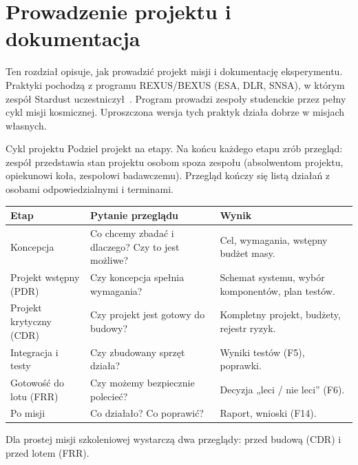 \chapter{Prowadzenie projektu i dokumentacja}\label{ch:projekt}

Ten rozdział opisuje, jak prowadzić projekt misji i dokumentację eksperymentu. Praktyki pochodzą z programu REXUS/BEXUS (ESA, DLR, SNSA), w którym zespół Stardust uczestniczył~\cite{praca2022,sed}. Program prowadzi zespoły studenckie przez pełny cykl misji kosmicznej. Uproszczona wersja tych praktyk działa dobrze w misjach własnych.

\begin{sekcja}{Cykl projektu}
Podziel projekt na etapy. Na końcu każdego etapu zrób przegląd: zespół przedstawia stan projektu osobom spoza zespołu (absolwentom projektu, opiekunowi koła, zespołowi badawczemu). Przegląd kończy się listą działań z osobami odpowiedzialnymi i terminami.

\renewcommand{\arraystretch}{1.3}
\small
\begin{tabularx}{\linewidth}{@{}P{30mm}LL@{}}
\toprule
\textbf{Etap} & \textbf{Pytanie przeglądu} & \textbf{Wynik}\\\midrule
Koncepcja & Co chcemy zbadać i dlaczego? Czy to jest możliwe? & Cel, wymagania, wstępny budżet masy.\\
Projekt wstępny (PDR) & Czy koncepcja spełnia wymagania? & Schemat systemu, wybór komponentów, plan testów.\\
Projekt krytyczny (CDR) & Czy projekt jest gotowy do budowy? & Kompletny projekt, budżety, rejestr ryzyk.\\
Integracja i testy & Czy zbudowany sprzęt działa? & Wyniki testów (F5), poprawki.\\
Gotowość do lotu (FRR) & Czy możemy bezpiecznie polecieć? & Decyzja „leci / nie leci” (F6).\\
Po misji & Co działało? Co poprawić? & Raport, wnioski (F14).\\
\bottomrule
\end{tabularx}
\normalsize

Dla prostej misji szkoleniowej wystarczą dwa przeglądy: przed budową (CDR) i przed lotem (FRR).
\end{sekcja}

